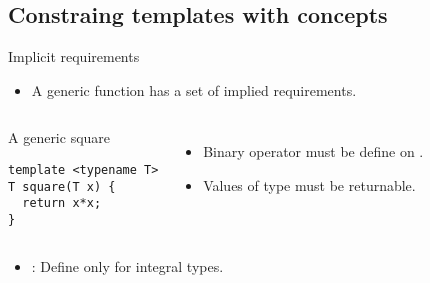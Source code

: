 \subsection{Constraing templates with concepts}

\begin{frame}[t,fragile]{Implicit requirements}
\begin{itemize}
  \item A generic function has a set of implied requirements.
\end{itemize}

\begin{columns}[T]

\begin{block}{A generic square}
\begin{lstlisting}
template <typename T>
T square(T x) {
  return x*x;
}
\end{lstlisting}
\end{block}

\begin{itemize}
  \item Binary operator \cppkey{*} must be define on .
  \item Values of type  must be returnable.
\end{itemize}

\end{columns}

\begin{itemize}
  \item {}: Define only for integral types.
\end{itemize}

\end{frame}

